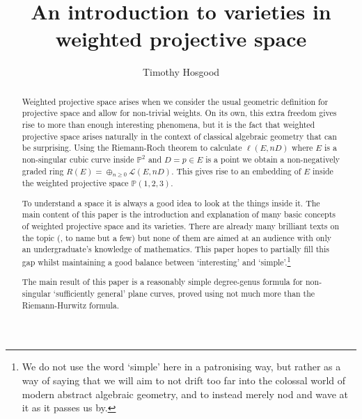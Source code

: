 \documentclass[10pt,notitlepage]{article}
\numberwithin{equation}{subsection}
\newcommand{\pee}{\mathbb{P}}
\begin{document}
    
    \author{Timothy Hosgood}
    \title{An introduction to varieties in weighted projective space}
    \maketitle


    \begin{abstract}
        Weighted projective space arises when we consider the usual geometric definition for projective space and allow for non-trivial weights.
        On its own, this extra freedom gives rise to more than enough interesting phenomena, but it is the fact that weighted projective space arises naturally in the context of classical algebraic geometry that can be surprising.
        Using the Riemann-Roch theorem to calculate $\ell(E,nD)$ where $E$ is a non-singular cubic curve inside $\pee^2$ and $D=p\in E$ is a point we obtain a non-negatively graded ring $R(E)=\oplus_{n\geqslant0}\mathcal{L}(E,nD)$.
        This gives rise to an embedding of $E$ inside the weighted projective space $\pee(1,2,3)$.

        To understand a space it is always a good idea to look at the things inside it.
        The main content of this paper is the introduction and explanation of many basic concepts of weighted projective space and its varieties.
        There are already many brilliant texts on the topic (\cite{Reid:2002uy,IanoFletcher:2015wc}, to name but a few) but none of them are aimed at an audience with only an undergraduate's knowledge of mathematics.
        This paper hopes to partially fill this gap whilst maintaining a good balance between `interesting' and `simple'.\footnote{%
            We do not use the word `simple' here in a patronising way, but rather as a way of saying that we will aim to not drift too far into the colossal world of modern abstract algebraic geometry, and to instead merely nod and wave at it as it passes us by.
        }

        The main result of this paper is a reasonably simple degree-genus formula for non-singular `sufficiently general' plane curves, proved using not much more than the Riemann-Hurwitz formula.
    \end{abstract}


    \vspace{-3em}
    \tableofcontents
\end{document}
